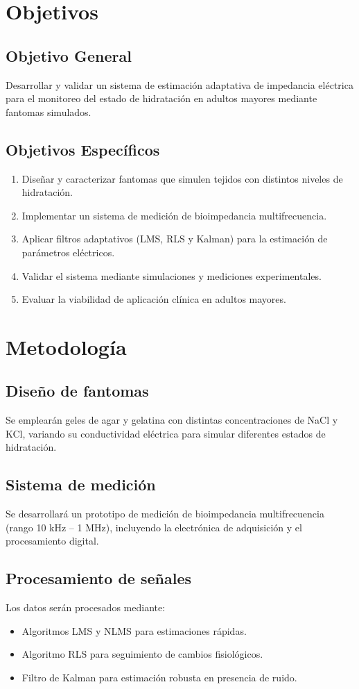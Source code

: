 \documentclass[12pt,a4paper]{article}
\begin{document}
\section{Objetivos}
\subsection{Objetivo General}
Desarrollar y validar un sistema de estimación adaptativa de impedancia eléctrica para el monitoreo del estado de hidratación en adultos mayores mediante fantomas simulados.

\subsection{Objetivos Específicos}
\begin{enumerate}
    \item Diseñar y caracterizar fantomas que simulen tejidos con distintos niveles de hidratación.
    \item Implementar un sistema de medición de bioimpedancia multifrecuencia.
    \item Aplicar filtros adaptativos (LMS, RLS y Kalman) para la estimación de parámetros eléctricos.
    \item Validar el sistema mediante simulaciones y mediciones experimentales.
    \item Evaluar la viabilidad de aplicación clínica en adultos mayores.
\end{enumerate}

\section{Metodología}
\subsection{Diseño de fantomas}
Se emplearán geles de agar y gelatina con distintas concentraciones de NaCl y KCl, variando su conductividad eléctrica para simular diferentes estados de hidratación.

\subsection{Sistema de medición}
Se desarrollará un prototipo de medición de bioimpedancia multifrecuencia (rango 10 kHz -- 1 MHz), incluyendo la electrónica de adquisición y el procesamiento digital.

\subsection{Procesamiento de señales}
Los datos serán procesados mediante:
\begin{itemize}
    \item Algoritmos LMS y NLMS para estimaciones rápidas.
    \item Algoritmo RLS para seguimiento de cambios fisiológicos.
    \item Filtro de Kalman para estimación robusta en presencia de ruido.
\end{itemize}
\end{document}
